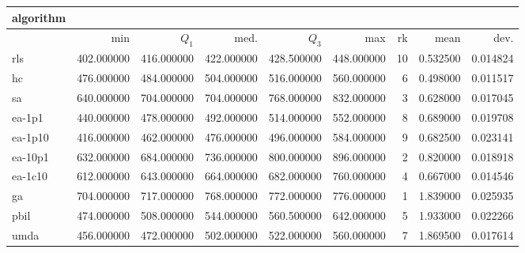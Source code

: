 \begin{tabular}{@{}l*{5}{>{{}}N{3}{0}}>{{}}N{2}{0}N{1}{3}N{1}{3}@{}}
\toprule
{algorithm} &  &  \\
\midrule
& {min} & {$Q_1$} & {med.} & {$Q_3$} & {max} & {rk} & {mean} & {dev.} \\
\midrule
rls & 402.000000 & 416.000000 & 422.000000 & 428.500000 & 448.000000 & 10 & 0.532500 & 0.014824 \\
 hc & 476.000000 & 484.000000 & 504.000000 & 516.000000 & 560.000000 & 6 & 0.498000 & 0.011517 \\
 sa & 640.000000 & 704.000000 & 704.000000 & 768.000000 & 832.000000 & 3 & 0.628000 & 0.017045 \\
 ea-1p1 & 440.000000 & 478.000000 & 492.000000 & 514.000000 & 552.000000 & 8 & 0.689000 & 0.019708 \\
 ea-1p10 & 416.000000 & 462.000000 & 476.000000 & 496.000000 & 584.000000 & 9 & 0.682500 & 0.023141 \\
 ea-10p1 & 632.000000 & 684.000000 & 736.000000 & {\color{blue}} 800.000000 & {\color{blue}} 896.000000 & 2 & 0.820000 & 0.018918 \\
 ea-1c10 & 612.000000 & 643.000000 & 664.000000 & 682.000000 & 760.000000 & 4 & 0.667000 & 0.014546 \\
 ga & {\color{blue}} 704.000000 & {\color{blue}} 717.000000 & {\color{blue}} 768.000000 & 772.000000 & 776.000000 & 1 & 1.839000 & 0.025935 \\
 pbil & 474.000000 & 508.000000 & 544.000000 & 560.500000 & 642.000000 & 5 & 1.933000 & 0.022266 \\
 umda & 456.000000 & 472.000000 & 502.000000 & 522.000000 & 560.000000 & 7 & 1.869500 & 0.017614 \\
 \bottomrule
\end{tabular}
